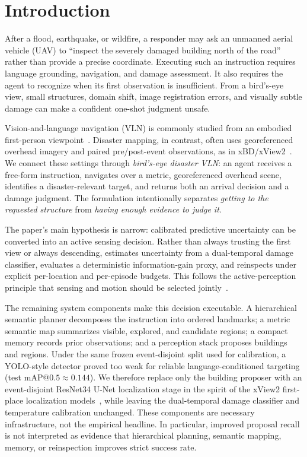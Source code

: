 \section{Introduction}
\label{sec:introduction}

After a flood, earthquake, or wildfire, a responder may ask an unmanned aerial vehicle (UAV) to ``inspect the severely damaged building north of the road'' rather than provide a precise coordinate.
Executing such an instruction requires language grounding, navigation, and damage assessment.
It also requires the agent to recognize when its first observation is insufficient.
From a bird's-eye view, small structures, domain shift, image registration errors, and visually subtle damage can make a confident one-shot judgment unsafe.

Vision-and-language navigation (VLN) is commonly studied from an embodied first-person viewpoint~\cite{anderson2018vision}.
Disaster mapping, in contrast, often uses georeferenced overhead imagery and paired pre/post-event observations, as in xBD/xView2~\cite{gupta2019xbd}.
We connect these settings through \emph{bird's-eye disaster VLN}: an agent receives a free-form instruction, navigates over a metric, georeferenced overhead scene, identifies a disaster-relevant target, and returns both an arrival decision and a damage judgment.
The formulation intentionally separates \emph{getting to the requested structure} from \emph{having enough evidence to judge it}.

The paper's main hypothesis is narrow: calibrated predictive uncertainty can be converted into an active sensing decision.
Rather than always trusting the first view or always descending, \ProjectName estimates uncertainty from a dual-temporal damage classifier, evaluates a deterministic information-gain proxy, and reinspects under explicit per-location and per-episode budgets.
This follows the active-perception principle that sensing and motion should be selected jointly~\cite{bajcsy1988active}.

The remaining system components make this decision executable.
A hierarchical semantic planner decomposes the instruction into ordered landmarks; a metric semantic map summarizes visible, explored, and candidate regions; a compact memory records prior observations; and a perception stack proposes buildings and regions.
Under the same frozen event-disjoint split used for calibration, a YOLO-style detector proved too weak for reliable language-conditioned targeting (test mAP@$0.5\approx0.144$).
We therefore replace only the building proposer with an event-disjoint ResNet34 U-Net localization stage in the spirit of the xView2 first-place localization models~\cite{gupta2019xbd}, while leaving the dual-temporal damage classifier and temperature calibration unchanged.
These components are necessary infrastructure, not the empirical headline.
In particular, improved proposal recall is not interpreted as evidence that hierarchical planning, semantic mapping, memory, or reinspection improves strict success rate.

